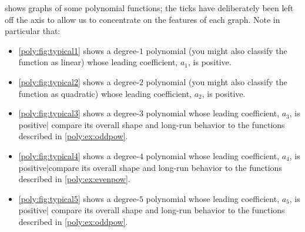 	 \begin{pccexample}\label{poly:ex:typical}
		  shows graphs of some polynomial functions;
		 the ticks have deliberately been left off the axis to allow us to concentrate
		 on the features of each graph. Note in particular that:
		 \begin{itemize}
			 \item \cref{poly:fig:typical1} shows a degree-$1$ polynomial (you might also
			       classify the function as linear) whose leading coefficient, $a_1$, is positive.
			 \item \cref{poly:fig:typical2} shows a degree-$2$ polynomial (you might also
			       classify the function as quadratic) whose leading coefficient, $a_2$, is positive.
			 \item \cref{poly:fig:typical3} shows a degree-$3$ polynomial whose leading coefficient, $a_3$,
			       is positive| compare its overall
			       shape and long-run behavior to the functions described in \cref{poly:ex:oddpow}.
			 \item \cref{poly:fig:typical4} shows a degree-$4$ polynomial whose leading coefficient, $a_4$,
			       is positive|compare its overall shape and long-run behavior to the functions described in \cref{poly:ex:evenpow}.
			 \item \cref{poly:fig:typical5} shows a degree-$5$ polynomial whose leading coefficient, $a_5$,
			       is positive| compare its overall
			       shape and long-run behavior to the functions described in \cref{poly:ex:oddpow}.
		 \end{itemize}
	 \end{pccexample}

